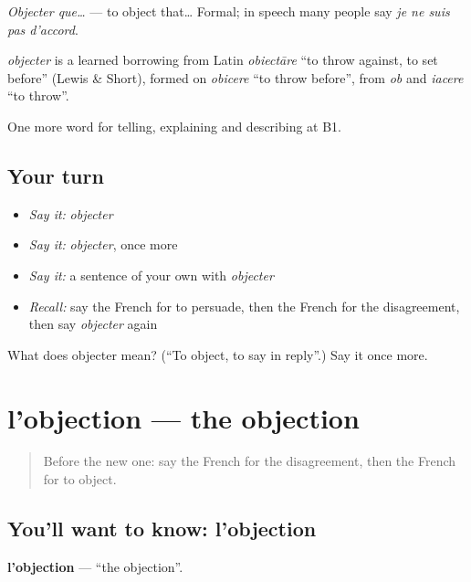\emph{Objecter que…} — to object that… Formal; in speech many people say \emph{je ne suis pas d'accord}.

\begin{cousinweb}
\emph{objecter} is a learned borrowing from Latin \emph{obiectāre} \textquotedblleft{}to throw against, to set before\textquotedblright{} (Lewis \& Short), formed on \emph{obicere} \textquotedblleft{}to throw before\textquotedblright{}, from \emph{ob} and \emph{iacere} \textquotedblleft{}to throw\textquotedblright{}.
\end{cousinweb}

\begin{grammarlens}[title={What you've built}]
One more word for telling, explaining and describing at B1.
\end{grammarlens}

\subsection*{Your turn}
\begin{itemize}
\raggedright
  \item \emph{Say it:} \emph{objecter}
  \item \emph{Say it:} \emph{objecter}, once more
  \item \emph{Say it:} a sentence of your own with \emph{objecter}
  \item \emph{Recall:} say the French for to persuade, then the French for the disagreement, then say \emph{objecter} again
\end{itemize}

\begin{tcolorbox}[breakable,colback=teal!4,colframe=teal!35!black,title={Before you move on}]
What does objecter mean? (\textquotedblleft{}To object, to say in reply\textquotedblright{}.) Say it once more.
\end{tcolorbox}
\section[l'objection]{l'objection — the objection}

\label{lesson:FR-C336-objection}



\begin{quote}
Before the new one: say the French for the disagreement, then the French for to object.
\end{quote}

\subsection*{You'll want to know: l'objection}
\textbf{l'objection} — \textquotedblleft{}the objection\textquotedblright{}.

